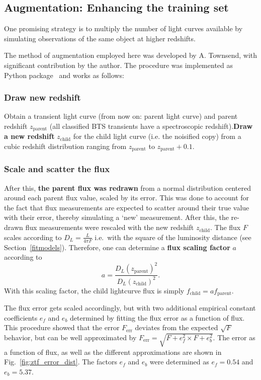 \subsection{Augmentation: Enhancing the training set}\label{noisification}
One promising strategy is to multiply the number of light curves available by simulating observations of the same object at higher redshifts.

The method of augmentation employed here was developed by A. Townsend, with significant contribution by the author. The procedure was implemented as Python package~ and works as follows:

\subsubsection{Draw new redshift}
Obtain a transient light curve (from now on: parent light curve) and parent redshift $z_\text{parent}$ (all classified BTS transients have a spectroscopic redshift).\textbf{Draw a new redshift} $z_\text{child}$ for the child light curve (i.e. the noisified copy) from a cubic redshift distribution ranging from $z­_\text{parent}$ to $z_\text{parent}+0.1$.

\subsubsection{Scale and scatter the flux}
After this, \textbf{the parent flux was redrawn} from a normal distribution centered around each parent flux value, scaled by its error. This was done to account for the fact that flux measurements are expected to scatter around their true value with their error, thereby simulating a `new' measurement. After this, the re-drawn flux measurements were rescaled with the new redshift $z_\text{child}$. The flux $F$ scales according to $D_L=\frac{L}{4 \pi F}$ i.e.~with the square of the luminosity distance (see Section~\ref{fitmodels}). Therefore, one can determine a \textbf{flux scaling factor} $a$ according to
\begin{equation}
  a = \frac{D_L(z_\text{parent})^2}{D_L(z_\text{child})^2}.
\end{equation}
With this scaling factor, the child lightcurve flux is simply $f_\text{child} = a f_\text{parent}$.

The flux error gets scaled accordingly, but with two additional empirical constant coefficients $e_f$ and $e_b$ determined by fitting the flux error as a function of flux. This procedure showed that the error $F_\text{err}$ deviates from the expected $\sqrt{F}$ behavior, but can be well approximated by $F_\text{err} = \sqrt{F + e_f^2\times F + e_b^2}$. The error as a function of flux, as well as the different approximations are shown in Fig.~\ref{fig:ztf_error_dist}. The factors $e_f$ and $e_b$ were determined as $e_f = 0.54$ and $e_b = 5.37$.

